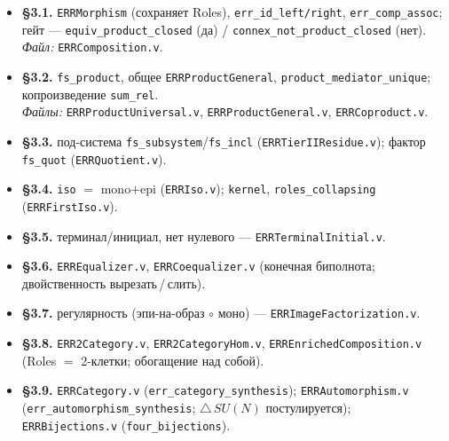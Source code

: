\documentclass[12pt,a4paper]{article}
\begin{document}
\begin{itemize}\itemsep2pt
\item \textbf{§3.1.} \texttt{ERRMorphism} (сохраняет Roles), \texttt{err\_id\_left/right},
\texttt{err\_comp\_assoc}; гейт --- \texttt{equiv\_product\_closed} (да) /
\texttt{connex\_not\_product\_closed} (нет).\\
\emph{Файл:} \texttt{ERRComposition.v}.

\item \textbf{§3.2.} \texttt{fs\_product}, общее \texttt{ERRProductGeneral},
\texttt{product\_mediator\_unique}; копроизведение \texttt{sum\_rel}.\\
\emph{Файлы:} \texttt{ERRProductUniversal.v}, \texttt{ERRProductGeneral.v}, \texttt{ERRCoproduct.v}.

\item \textbf{§3.3.} под-система \texttt{fs\_subsystem}/\texttt{fs\_incl}
(\texttt{ERRTierIIResidue.v}); фактор \texttt{fs\_quot} (\texttt{ERRQuotient.v}).

\item \textbf{§3.4.} \texttt{iso} $=$ mono$+$epi (\texttt{ERRIso.v}); \texttt{kernel},
\texttt{roles\_collapsing} (\texttt{ERRFirstIso.v}).

\item \textbf{§3.5.} терминал/инициал, нет нулевого --- \texttt{ERRTerminalInitial.v}.

\item \textbf{§3.6.} \texttt{ERREqualizer.v}, \texttt{ERRCoequalizer.v} (конечная биполнота;
двойственность вырезать\,/\,слить).

\item \textbf{§3.7.} регулярность (эпи-на-образ $\circ$ моно) --- \texttt{ERRImageFactorization.v}.

\item \textbf{§3.8.} \texttt{ERR2Category.v}, \texttt{ERR2CategoryHom.v},
\texttt{ERREnrichedComposition.v} (Roles $=$ 2-клетки; обогащение над собой).

\item \textbf{§3.9.} \texttt{ERRCategory.v} (\texttt{err\_category\_synthesis});
\texttt{ERRAutomorphism.v} (\texttt{err\_automorphism\_synthesis}; \ensuremath{\boldsymbol{\triangle}}\,$SU(N)$ постулируется);
\texttt{ERRBijections.v} (\texttt{four\_bijections}).
\end{itemize}
\normalsize

\end{document}
